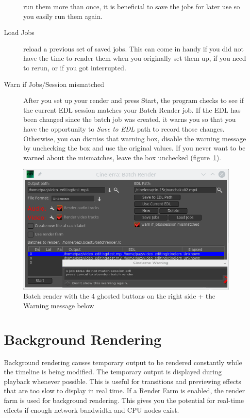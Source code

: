 \begin{description}
    run them more than once, it is beneficial to save the jobs for later use so you easily run them again.
    \item[Load Jobs] reload a previous set of saved jobs.  This can come in handy if you did not have the
    time to render them when you originally set them up, if you need to rerun, or if you got interrupted.
    \item[Warn if Jobs/Session mismatched] After you set up your render and press Start, the program checks to see if the current EDL session matches your Batch Render job.  If the EDL has
    been changed since the batch job was created, it warns you so that you have the opportunity to \textit{Save to EDL} path to record those changes.  Otherwise, you can dismiss that warning box, disable the warning message by unchecking the box and use the original values.  If you never want to be warned about the mismatches, leave the box unchecked (figure~\ref{fig:batch02}).
\end{description}

\begin{figure}[htpb]
    \centering
    \includegraphics[width=0.8\linewidth]{images/batch02.png}
    \caption{Batch render with the 4 ghosted buttons on the right side + the Warning message below}
    \label{fig:batch02}
\end{figure}

\section{Background Rendering}%
\label{sec:background_rendering}

Background rendering causes temporary output to be rendered constantly while the timeline is being modified. The temporary output is displayed during playback whenever possible. This is useful for transitions and previewing effects that are too slow to display in real time. If a Render Farm is enabled, the render farm is used for background rendering. This gives you the potential for real-time effects if enough network bandwidth and CPU nodes exist.

